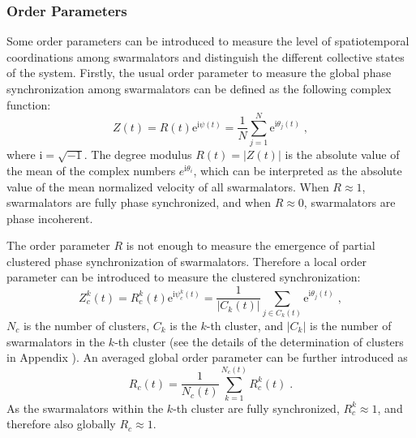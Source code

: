 \documentclass{article}
\begin{document}
\subsubsection{Order Parameters}
Some order parameters can be introduced to measure the level of spatiotemporal coordinations among swarmalators and distinguish the different collective states of the system. Firstly, the usual order parameter to measure the global phase synchronization among swarmalators can be defined as the following complex function:
\begin{equation}
    Z\left( t \right) =R\left( t \right) \mathrm{e}^{\textrm{i}\psi(t)}=\frac{1}{N}\sum_{j=1}^N{\mathrm{e}^{\textrm{i}\theta _j(t)}}\;,
\end{equation}
where $\textrm{i}=\sqrt{-1}$. The degree modulus $R(t)=\left|Z(t)\right|$ is the absolute value of the mean of the complex numbers $e^{\textrm{i}\theta _i}$, which can be interpreted as the absolute value of the mean normalized velocity of all swarmalators. When $R\approx 1$, swarmalators are fully phase synchronized, and when $R\approx0$, swarmalators are phase incoherent.

The order parameter $R$ is not enough to measure the emergence of partial clustered phase synchronization of swarmalators. Therefore a local order parameter can be introduced to measure the clustered synchronization:
\begin{equation}
    Z_c^k (t) = R_c^k \left( t \right) \mathrm{e}^{\textrm{i}\psi_c^k (t)} =  \frac{1}{\left| C_k\left( t \right) \right|}\sum_{j\in C_k\left( t \right)}{\mathrm{e}^{\mathrm{i}\theta _j\left( t \right)}} \;,
\end{equation}
$N_c$ is the number of clusters, $C_k$ is the $k$-th cluster, and $\left| C_k \right|$ is the number of swarmalators in the $k$-th cluster (see the details of the determination of clusters in Appendix ). An averaged global order parameter can be further introduced as
\begin{equation}
    R_c\left( t \right) =\frac{1}{N_c\left( t \right)}\sum_{k=1}^{N_c\left( t \right)}{R^k_c (t)}\;.
\end{equation}
As the swarmalators within the $k$-th cluster are fully synchronized, $R_c^k\approx 1$, and therefore also globally $R_c\approx 1$.
\end{document}
